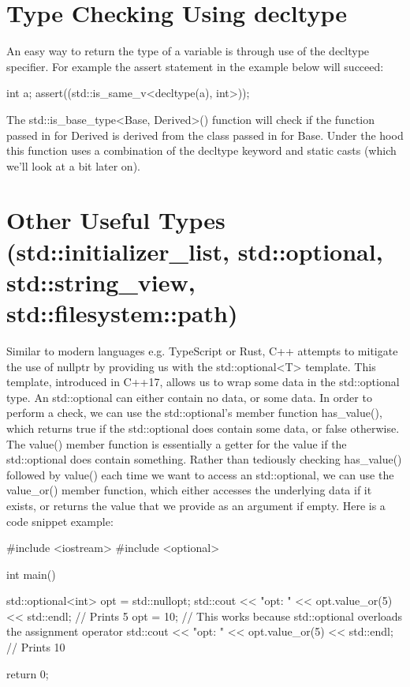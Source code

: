 \documentclass{article}
\begin{document}
\section{Type Checking Using decltype}

An easy way to return the type of a variable is through use of the decltype specifier. For example the assert
statement in the example below will succeed:

\begin{cpplst}

int a;
assert((std::is_same_v<decltype(a), int>));

\end{cpplst}

The std::is\_base\_type<Base, Derived>() function will check if the function passed in for Derived is derived
from the class passed in for Base. Under the hood this function uses a combination of the decltype keyword
and static casts (which we'll look at a bit later on).

\section{Other Useful Types (std::initializer\_list, std::optional, std::string\_view, std::filesystem::path)}

Similar to modern languages e.g. TypeScript or Rust, C++ attempts to mitigate the use of nullptr by providing
us with the std::optional<T> template. This template, introduced in C++17, allows us to wrap some data in the
std::optional type. An std::optional can either contain no data, or some data. In order to perform a check,
we can use the std::optional’s member function has\_value(), which returns true if the std::optional does
contain some data, or false otherwise. The value() member function is essentially a getter for the value if
the std::optional does contain something. Rather than tediously checking has\_value() followed by value() each
time we want to access an std::optional, we can use the value\_or() member function, which either accesses
the underlying data if it exists, or returns the value that we provide as an argument if empty. Here is a
code snippet example:

\begin{cpplst}

#include <iostream>
#include <optional>

int main()
{
    std::optional<int> opt = std::nullopt;
    std::cout << "opt: " << opt.value_or(5) << std::endl; // Prints 5
    opt = 10; // This works because std::optional overloads the assignment operator
    std::cout << "opt: " << opt.value_or(5) << std::endl; // Prints 10

    return 0;
}

\end{cpplst}
\end{document}
